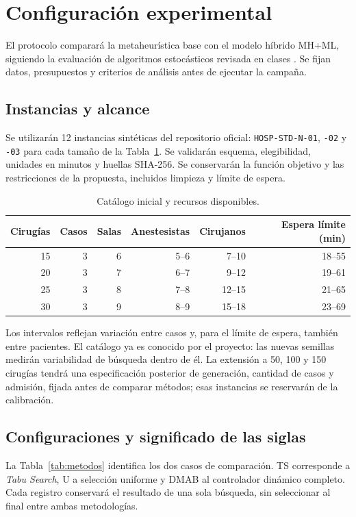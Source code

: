 \section{Configuración experimental}
\label{sec:experimental}
El protocolo comparará la metaheurística base con el modelo híbrido
MH+ML, siguiendo la evaluación de algoritmos estocásticos revisada
en clases \parencite{vega_comparacion}. Se fijan datos, presupuestos
y criterios de análisis antes de ejecutar la campaña.

\subsection{Instancias y alcance}
Se utilizarán 12 instancias sintéticas del repositorio oficial:
\texttt{HOSP-STD-N-01}, \texttt{-02} y \texttt{-03} para cada tamaño
de la Tabla~\ref{tab:instancias}. Se validarán esquema, elegibilidad,
unidades en minutos y huellas SHA-256. Se conservarán la función objetivo
y las restricciones de la propuesta, incluidos limpieza y límite de espera.

\begin{table}[ht]
 \centering
 \caption{Catálogo inicial y recursos disponibles.}
 \label{tab:instancias}
 \begin{tabular}{@{}rrrrrr@{}}
  \toprule
  Cirugías & Casos & Salas & Anestesistas & Cirujanos & Espera límite (min)\\
  \midrule
  15 & 3 & 6 & 5--6 & 7--10 & 18--55\\
  20 & 3 & 7 & 6--7 & 9--12 & 19--61\\
  25 & 3 & 8 & 7--8 & 12--15 & 21--65\\
  30 & 3 & 9 & 8--9 & 15--18 & 23--69\\
  \bottomrule
 \end{tabular}
\end{table}
Los intervalos reflejan variación entre casos y, para el límite de espera,
también entre pacientes. El catálogo ya es conocido por el proyecto:
las nuevas semillas medirán variabilidad de búsqueda dentro de él.
La extensión a 50, 100 y 150 cirugías tendrá una especificación posterior
de generación, cantidad de casos y admisión, fijada antes de comparar métodos;
esas instancias se reservarán de la calibración.

\subsection{Configuraciones y significado de las siglas}
La Tabla~\ref{tab:metodos} identifica los dos casos de comparación.
TS corresponde a \emph{Tabu Search}, U a selección uniforme y DMAB al
controlador dinámico completo. Cada registro conservará el resultado
de una sola búsqueda, sin seleccionar al final entre ambas metodologías.

